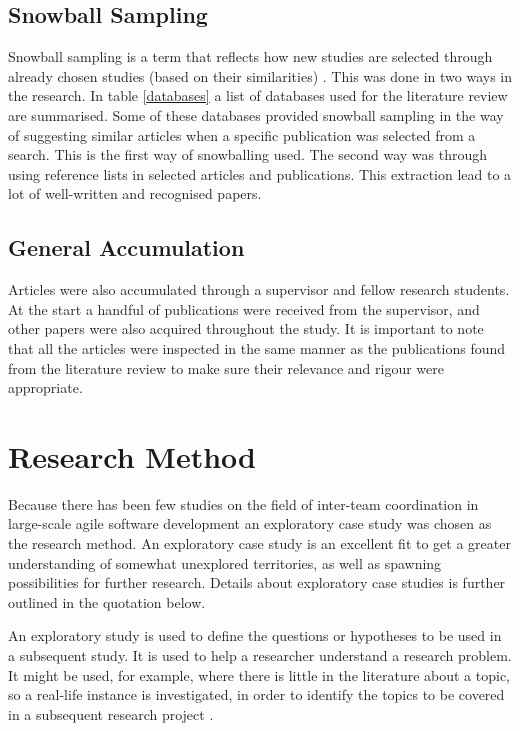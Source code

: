 \subsection{Snowball Sampling}

Snowball sampling is a term that reflects how new studies are selected through already chosen studies (based on their similarities) \cite{Goodman1961}. This was done in two ways in the research. In table \ref{databases} a list of databases used for the literature review are summarised. Some of these databases provided snowball sampling in the way of suggesting similar articles when a specific publication was selected from a search. This is the first way of snowballing used. The second way was through using reference lists in selected articles and publications. This extraction lead to a lot of well-written and recognised papers.

\subsection{General Accumulation}
\label{general}

Articles were also accumulated through a supervisor and fellow research students. At the start a handful of publications were received from the supervisor, and other papers were also acquired throughout the study. It is important to note that all the articles were inspected in the same manner as the publications found from the literature review to make sure their relevance and rigour were appropriate.

\section{Research Method}

Because there has been few studies on the field of inter-team coordination in large-scale agile software development an exploratory case study was chosen as the research method. An exploratory case study is an excellent fit to get a greater understanding of somewhat unexplored territories, as well as spawning possibilities for further research. Details about exploratory case studies is further outlined in the quotation below.

\begin{fancyquotes}
An exploratory study is used to define the questions or hypotheses to be used in a subsequent study. It is used to help a researcher understand a research problem. It might be used, for example, where there is little in the literature about a topic, so a real-life instance is investigated, in order to identify the topics to be covered in a subsequent research project \cite{}. 
\end{fancyquotes}

